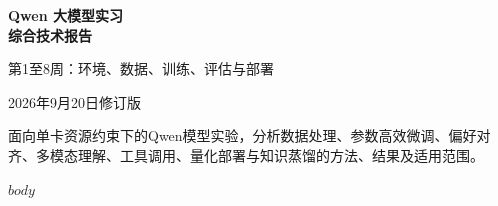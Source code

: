\documentclass[UTF8,fontset=fandol,a4paper,11pt]{ctexart}
\begin{document}
\hypersetup{pageanchor=false}
\begin{titlepage}
\centering
\vspace*{28mm}
{\sffamily\bfseries\fontsize{26}{36}\selectfont Qwen 大模型实习\\综合技术报告\par}
\vspace{12mm}
{\large 第1至8周：环境、数据、训练、评估与部署\par}
\vspace{8mm}
{\large 2026年9月20日修订版\par}
\vfill
\begin{minipage}{0.82\textwidth}
\normalsize
面向单卡资源约束下的Qwen模型实验，分析数据处理、参数高效微调、偏好对齐、多模态理解、工具调用、量化部署与知识蒸馏的方法、结果及适用范围。
\end{minipage}
\vspace{22mm}
\end{titlepage}
\hypersetup{pageanchor=true}
\tableofcontents
\clearpage
{}
$body$
\end{document}
